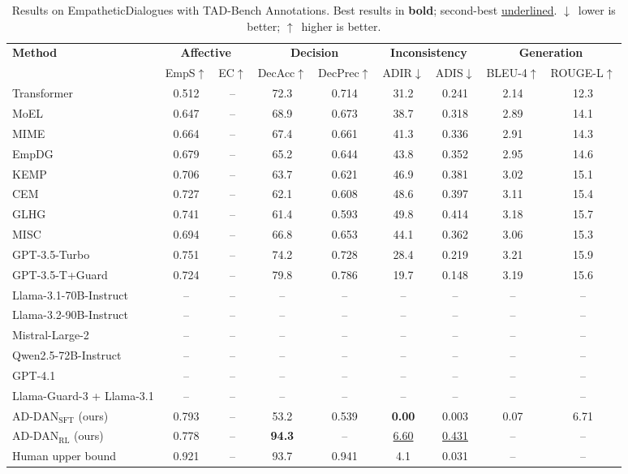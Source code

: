 \documentclass[lettersize,journal]{IEEEtran}
\begin{document}
\begin{table}[!t]
\centering
\caption{Results on EmpatheticDialogues with TAD-Bench Annotations.
Best results in \textbf{bold}; second-best \underline{underlined}.
$\downarrow$~lower is better; $\uparrow$~higher is better.}
\label{tab:ed_results}
\renewcommand{\arraystretch}{1.15}
\begin{tabular}{lcccccccc}
\toprule
\multirow{2}{*}{\textbf{Method}}
  & \multicolumn{2}{c}{\textbf{Affective}}
  & \multicolumn{2}{c}{\textbf{Decision}}
  & \multicolumn{2}{c}{\textbf{Inconsistency}}
  & \multicolumn{2}{c}{\textbf{Generation}} \\
\cmidrule(lr){2-3}\cmidrule(lr){4-5}\cmidrule(lr){6-7}\cmidrule(lr){8-9}
  & EmpS$\uparrow$
  & EC$\uparrow$
  & DecAcc$\uparrow$
  & DecPrec$\uparrow$
  & ADIR$\downarrow$
  & ADIS$\downarrow$
  & BLEU-4$\uparrow$
  & ROUGE-L$\uparrow$ \\
\midrule
Transformer      & 0.512 & -- & 72.3 & 0.714 & 31.2 & 0.241 & 2.14 & 12.3 \\
MoEL             & 0.647 & -- & 68.9 & 0.673 & 38.7 & 0.318 & 2.89 & 14.1 \\
MIME             & 0.664 & -- & 67.4 & 0.661 & 41.3 & 0.336 & 2.91 & 14.3 \\
EmpDG            & 0.679 & -- & 65.2 & 0.644 & 43.8 & 0.352 & 2.95 & 14.6 \\
KEMP             & 0.706 & -- & 63.7 & 0.621 & 46.9 & 0.381 & 3.02 & 15.1 \\
CEM              & 0.727 & -- & 62.1 & 0.608 & 48.6 & 0.397 & 3.11 & 15.4 \\
GLHG             & 0.741 & -- & 61.4 & 0.593 & 49.8 & 0.414 & 3.18 & 15.7 \\
MISC             & 0.694 & -- & 66.8 & 0.653 & 44.1 & 0.362 & 3.06 & 15.3 \\
GPT-3.5-Turbo    & 0.751 & -- & 74.2 & 0.728 & 28.4 & 0.219 & 3.21 & 15.9 \\
GPT-3.5-T+Guard  & 0.724 & -- & 79.8 & 0.786 & 19.7 & 0.148 & 3.19 & 15.6 \\
Llama-3.1-70B-Instruct & -- & -- & -- & -- & -- & -- & -- & -- \\
Llama-3.2-90B-Instruct & -- & -- & -- & -- & -- & -- & -- & -- \\
Mistral-Large-2        & -- & -- & -- & -- & -- & -- & -- & -- \\
Qwen2.5-72B-Instruct   & -- & -- & -- & -- & -- & -- & -- & -- \\
GPT-4.1                & -- & -- & -- & -- & -- & -- & -- & -- \\
Llama-Guard-3 + Llama-3.1 & -- & -- & -- & -- & -- & -- & -- & -- \\
\midrule
AD-DAN$_\mathrm{SFT}$ (ours)
                 & 0.793 & -- & 53.2 & 0.539 & \textbf{0.00} & 0.003 & 0.07 & 6.71 \\
AD-DAN$_\mathrm{RL}$ (ours)
                 & 0.778 & -- & \textbf{94.3} & -- & \underline{6.60} & \underline{0.431} & -- & -- \\
\midrule
Human upper bound & 0.921 & -- & 93.7 & 0.941 & 4.1 & 0.031 & -- & -- \\
\bottomrule
\end{tabular}
\end{table}
\end{document}

